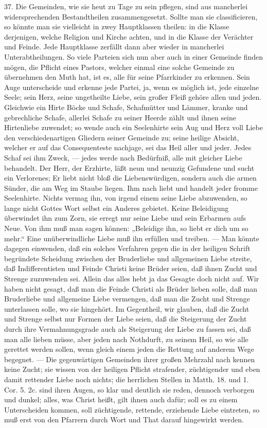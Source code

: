 37. Die Gemeinden, wie sie heut zu Tage zu sein pflegen, sind aus mancherlei widersprechenden Bestandtheilen zusammengesetzt. Sollte man sie classificieren, so könnte man sie vielleicht in zwey Hauptklassen theilen: in die Klasse derjenigen, welche Religion und Kirche achten, und in die Klasse der Verächter und Feinde. Jede Hauptklasse zerfällt dann aber wieder in mancherlei Unterabtheilungen. So viele Parteien sich nun aber auch in einer Gemeinde finden mögen, die Pflicht eines Pastors, welcher einmal eine solche Gemeinde zu übernehmen den Muth hat, ist es, alle für seine Pfarrkinder zu erkennen. Sein Auge unterscheide und erkenne jede Partei, ja, wenn es möglich ist, jede einzelne Seele; sein Herz, seine ungetheilte Liebe, sein großer Fleiß gehöre allen und jeden. Gleichwie ein Hirte Böcke und Schafe, Schafmütter und Lämmer, kranke und gebrechliche Schafe, allerlei Schafe zu seiner Heerde zählt und ihnen seine Hirtenliebe zuwendet; so wende auch ein Seelenhirte sein Aug und Herz voll
Liebe den verschiedenartigen Gliedern seiner Gemeinde zu; seine heilige Absicht, welcher er auf das Consequenteste nachjage, sei das Heil aller und jeder. Jedes Schaf sei ihm Zweck, — jedes werde nach Bedürfniß, alle mit gleicher Liebe behandelt. Der Herr, der Erzhirte, läßt neun und neunzig Gefundene und sucht ein Verlorenes; Er liebt nicht bloß die Liebenswürdigen, sondern auch die armen Sünder, die am Weg im Staube liegen. Ihm nach liebt und handelt jeder fromme Seelenhirte. Nichts vermag ihn, von irgend einem seine Liebe abzuwenden, so lange nicht Gottes Wort selbst ein Anderes gebietet. Keine Beleidigung überwindet ihn zum Zorn, sie erregt nur seine Liebe und sein Erbarmen aufs Neue. Von ihm muß man sagen können: „Beleidige ihn, so liebt er dich um so mehr.“ Eine unüberwindliche Liebe muß ihn erfüllen und treiben. — Man könnte dagegen einwenden, daß ein solches Verfahren gegen die in der heiligen Schrift begründete Scheidung zwischen der Bruderliebe und allgemeinen Liebe streite, daß Indifferentisten und Feinde Christi keine Brüder seien, daß ihnen Zucht und Strenge zuzuwenden sei. Allein das alles hebt ja das Gesagte doch nicht auf. Wir haben nicht gesagt, daß man die Feinde Christi als Brüder lieben solle, daß man Bruderliebe und allgemeine Liebe vermengen, daß man die Zucht und Strenge unterlassen solle, wo sie hingehört. Im Gegentheil, wir glauben, daß die Zucht und Strenge selbst nur Formen der Liebe seien, daß die Steigerung der Zucht durch ihre Vermahnungsgrade auch als Steigerung der Liebe zu fassen sei, daß man alle lieben müsse, aber jeden nach Nothdurft, zu seinem Heil, so wie
alle gerettet werden sollen, wenn gleich einem jeden die Rettung auf anderem Wege begegnet. — Die gegenwärtigen Gemeinden ihrer großen Mehrzahl nach kennen keine Zucht; sie wissen von der heiligen Pflicht strafender, züchtigender und eben damit rettender Liebe noch nichts; die herrlichen Stellen in Matth. 18. und 1. Cor. 5. 2c. sind ihren Augen, so klar und deutlich sie reden, dennoch verborgen und dunkel; alles, was Christ heißt, gilt ihnen auch dafür; soll es zu einem Unterscheiden kommen, soll züchtigende, rettende, erziehende Liebe eintreten, so muß erst von den Pfarrern durch Wort und That darauf hingewirkt werden.

